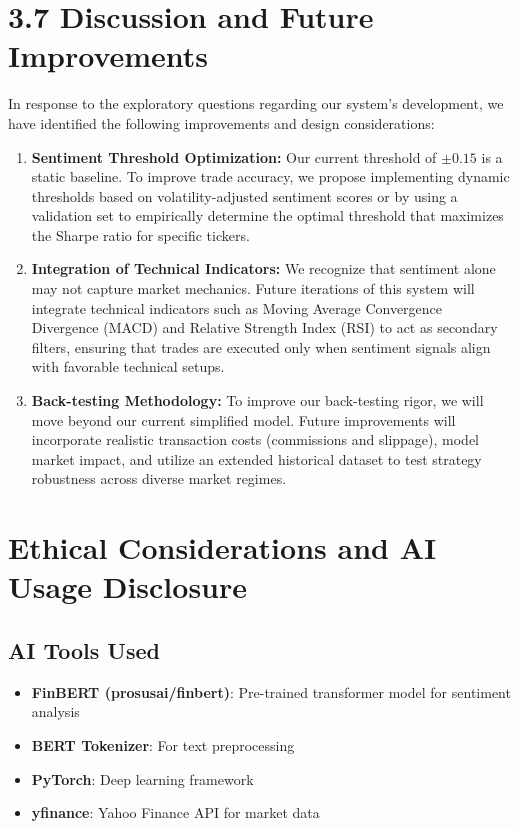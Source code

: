 \documentclass[12pt]{article}
\begin{document}
\section{3.7 Discussion and Future Improvements}
In response to the exploratory questions regarding our system's development, we have identified the following improvements and design considerations:

\begin{enumerate}
    \item \textbf{Sentiment Threshold Optimization:} Our current threshold of $\pm0.15$ is a static baseline. To improve trade accuracy, we propose implementing dynamic thresholds based on volatility-adjusted sentiment scores or by using a validation set to empirically determine the optimal threshold that maximizes the Sharpe ratio for specific tickers.
    
    \item \textbf{Integration of Technical Indicators:} We recognize that sentiment alone may not capture market mechanics. Future iterations of this system will integrate technical indicators such as Moving Average Convergence Divergence (MACD) and Relative Strength Index (RSI) to act as secondary filters, ensuring that trades are executed only when sentiment signals align with favorable technical setups.
    
    \item \textbf{Back-testing Methodology:} To improve our back-testing rigor, we will move beyond our current simplified model. Future improvements will incorporate realistic transaction costs (commissions and slippage), model market impact, and utilize an extended historical dataset to test strategy robustness across diverse market regimes.
\end{enumerate}

\section{Ethical Considerations and AI Usage Disclosure}

\subsection{AI Tools Used}

\begin{itemize}
\item \textbf{FinBERT (prosusai/finbert)}: Pre-trained transformer model for sentiment analysis
\item \textbf{BERT Tokenizer}: For text preprocessing
\item \textbf{PyTorch}: Deep learning framework
\item \textbf{yfinance}: Yahoo Finance API for market data
\end{itemize}
\end{document}
